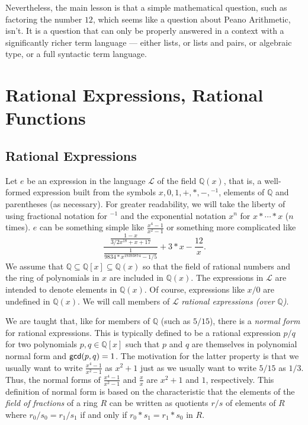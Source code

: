 \documentclass[fleqn]{llncs}
\newcommand{\QQ}{\ensuremath{\mathbb{Q}}}
\newcommand{\Lang}{\ensuremath{\mathcal{L}}}
\begin{document}
Nevertheless, the main lesson is that a simple mathematical question,
such as factoring the number $12$, which seems like a question about
Peano Arithmetic, isn't. It is a question that can only be properly answered
in a context with a significantly richer term language --- either lists,
or lists and pairs, or algebraic type, or a full syntactic term language.

\section{Rational Expressions, Rational Functions}

\subsection{Rational Expressions}

Let $e$ be an expression in the language $\Lang$ of the field
$\QQ(x)$, that is, a well-formed expression built from the symbols $x,
0, 1, +, *, -, \phantom{}^{-1}$, elements of $\QQ$ and parentheses (as
necessary).  For greater readability, we will take the liberty of
using fractional notation for $\phantom{}^{-1}$ and the exponential
notation $x^n$ for $x * \cdots * x$ ($n$ times).  $e$ can be something
simple like $\frac{x^4-1}{x^2-1}$ or something more complicated like
\begin{equation*}
\frac{\frac{1-x}{3/2 x^{18} + x + 17}}
     {\frac{1}{9834*x^{19393874}-1/5}}+3*x -\frac{12}{x}.
\end{equation*}
We assume that $\QQ \subseteq \QQ[x] \subseteq \QQ(x)$ so that the
field of rational numbers and the ring of polynomials in $x$ are
included in $\QQ(x)$.  The expressions in $\Lang$ are intended to
denote elements in $\QQ(x)$.  Of course, expressions like $x/0$ are
undefined in $\QQ(x)$.  We will call members of $\Lang$ \emph{rational
  expressions (over $\QQ$)}.

We are taught that, like for members of $\QQ$ (such as $5/15$), there
is a \emph{normal form} for rational expressions. This is typically
defined to be a rational expression $p/q$ for two polynomials $p,q \in \QQ[x]$
such that $p$ and $q$ are themselves in polynomial normal form and
$\mbox{\sf gcd}(p,q) = 1$.  The motivation for the latter
property is that we usually want to write $\frac{x^4-1}{x^2-1}$ as
$x^2 + 1$ just as we usually want to write $5/15$ as $1/3$.  Thus, the
normal forms of $\frac{x^4-1}{x^2-1}$ and $\frac{x}{x}$ are $x^2 + 1$
and $1$, respectively.  This definition of normal form is based on the
characteristic that the elements of the \emph{field of fractions} of a
ring $R$ can be written as quotients $r/s$ of elements of $R$ where
$r_0/s_0 = r_1/s_1$ if and only if $r_0 * s_1 = r_1 * s_0$ in $R$.
\end{document}
